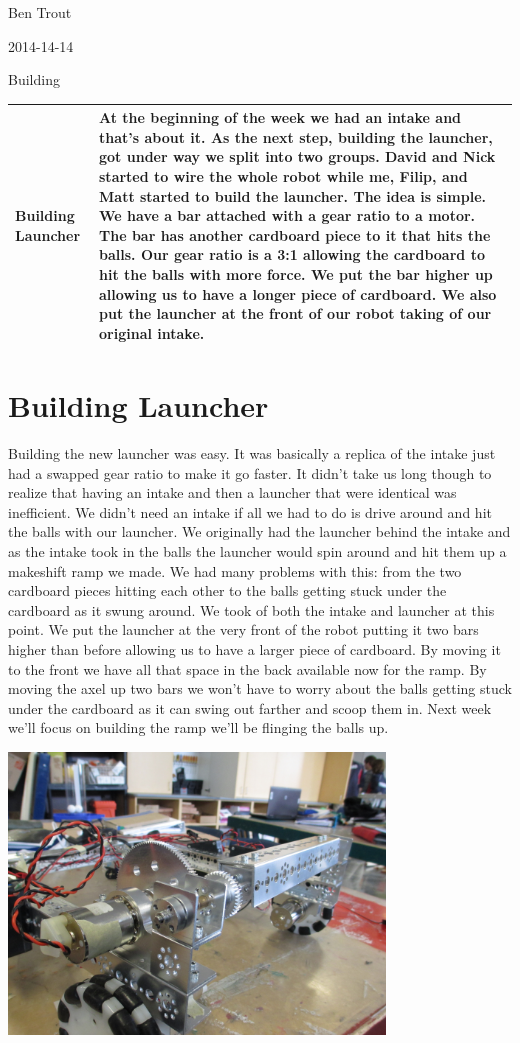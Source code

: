 Ben Trout

2014-14-14

Building

\begin{tabular}{|p{5cm}|p{5cm}|}
\hline
Building Launcher&
At the beginning of the week we had an intake and that’s about it. As the next step, building the launcher, got under way we split into two groups. David and Nick started to wire the whole robot while me, Filip, and Matt started to build the launcher. The idea is simple. We have a bar attached with a gear ratio to a motor. The bar has another cardboard piece to it that hits the balls. Our gear ratio is a 3:1 allowing the cardboard to hit the balls with more force. We put the bar higher up allowing us to have a longer piece of cardboard. We also put the launcher at the front of our robot taking of our original intake. 
\\
\hline
\end{tabular}

\section*{Building Launcher}
Building the new launcher was easy. It was basically a replica of the intake just had a swapped gear ratio to make it go faster. It didn’t take us long though to realize that having an intake and then a launcher that were identical was inefficient. We didn’t need an intake if all we had to do is drive around and hit the balls with our launcher. We originally had the launcher behind the intake and as the intake took in the balls the launcher would spin around and hit them up a makeshift ramp we made. We had many problems with this: from the two cardboard pieces hitting each other to the balls getting stuck under the cardboard as it swung around. We took of both the intake and launcher at this point. We put the launcher at the very front of the robot putting it two bars higher than before allowing us to have a larger piece of cardboard. By moving it to the front we have all that space in the back available now for the ramp. By moving the axel up two bars we won’t have to worry about the balls getting stuck under the cardboard as it can swing out farther and scoop them in. Next week we’ll focus on building the ramp we’ll be flinging the balls up. 

\begin{center}
\includegraphics[width=10cm]{./Entries/Images/LauncherInFront.jpg}
\end{center}
